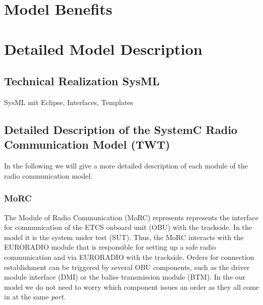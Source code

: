 \documentclass{template/openetcs_article}
\begin{document}
\section{Model Benefits}
\label{sec:model-highlights}

%
%


\section{Detailed Model Description}
\label{sec:deta-model-descr}

\subsection{Technical Realization SysML}
SysML mit Eclipse, Interfaces, Templates

\subsection{Detailed Description of the SystemC Radio Communication Model (TWT)}
\label{sct:radiocommdetailed}

In the following we will give a more detailed description of each module of the radio communication model.

\subsubsection{MoRC}

The Module of Radio Communication (MoRC) represents represents the interface for communication of the ETCS onboard unit (OBU) with the trackside. In the model it is the system under test (SUT). Thus, the MoRC interacts with the EURORADIO module that is responsible for setting up a safe radio communication and via EURORADIO with the trackside. Orders for connection establishment can be triggered by several OBU components, such as the driver module interface (DMI) or the balise transmission module (BTM). In the our model we do not need to worry which component issues an order as they all come in at the same \emph{port}.
\end{document}
